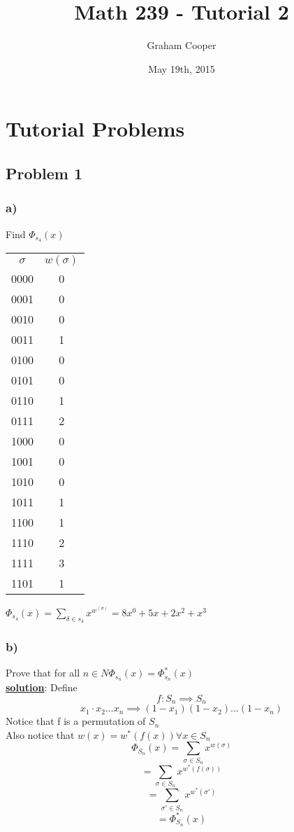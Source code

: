 \documentclass[12pt]{article}
\title{\vspace{-15ex}Math 239 - Tutorial 2\vspace{-1ex}}
\date{May 19th, 2015}
\author{Graham Cooper}
\newcommand{\myt}[1]{\textbf{\underline{#1}}}
\begin{document}
	\maketitle
	\section*{Tutorial Problems}
	\subsection*{Problem 1}
	\subsubsection*{a)}
	Find $\Phi_{s_4}(x)$\\
	\begin{tabular}{c | c}
		$\sigma$ & $w(\sigma)$ \\
		0000 & 0 \\
		0001 & 0 \\ 
		0010 & 0 \\
		0011 & 1 \\
		0100 & 0\\
		0101 & 0\\
		0110 & 1\\
		0111 & 2\\
		1000 & 0\\
		1001 & 0\\
		1010 & 0\\
		1011 & 1\\
		1100 & 1\\
		1110 & 2\\
		1111 & 3\\
		1101 & 1\\
	\end{tabular}
	
	$\Phi_{s_4}(x) = \sum_{\delta \in s_4}x^{w^(\sigma)} = 8x^0 + 5x + 2x^2 + x^3$\\
	\subsubsection*{b)}
	Prove that for all $n \in N \Phi_{s_n}(x) = \Phi^*_{s_n}(x)$\\
	
	\myt{solution}: Define\\
	$$f: S_n \implies S_n$$
	$$x_1 \cdot x_2 ... x_n \implies (1-x_1)(1-x_2)...(1-x_n)$$
	Notice that f is a permutation of $S_n$\\
	Also notice that $w(x) = w^*(f(x)) \forall x \in S_n$\\
	$$\Phi_{S_n}(x) = \sum_{\sigma \in S_n}x^{w(\sigma)}$$
	$$= \sum_{\sigma \in S_n}x^{w^*(f(\sigma))}$$
	$$= \sum_{\sigma' \in S_n}x^{w^*(\sigma')}$$
	$$= \Phi_{S_n}^*(x)$$
	
\end{document}
